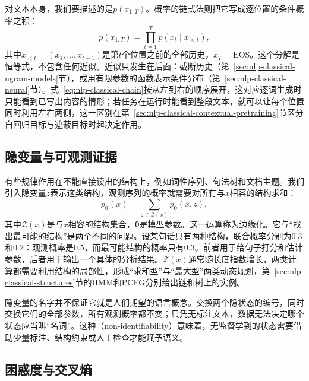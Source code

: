 对文本本身，我们要描述的是$p(x_{1:T})$。概率的链式法则把它写成逐位置的条件概率之积：
\begin{equation}
  p(x_{1:T})=\prod_{t=1}^{T}p(x_t\mid x_{<t}),
  \label{eq:nlp-classical-chain}
\end{equation}
其中$x_{<t}=(x_1,\ldots,x_{t-1})$是第$t$个位置之前的全部历史，$x_T=\mathrm{EOS}$。这个分解是恒等式，不包含任何近似。近似只发生在后面：截断历史（第~\ref{sec:nlp-classical-ngram-models}节），或用有限参数的函数表示条件分布（第~\ref{sec:nlp-classical-neural}节）。式~\eqref{eq:nlp-classical-chain}按从左到右的顺序展开，这对应逐词生成时只能看到已写出内容的情形；若任务在运行时能看到整段文本，就可以让每个位置同时利用左右两侧，这一区别在第~\ref{sec:nlp-classical-contextual-pretraining}节区分自回归目标与遮蔽目标时起决定作用。

\subsection{隐变量与可观测证据}
\label{sec:nlp-classical-latent}

有些规律作用在不能直接读出的结构上，例如词性序列、句法树和文档主题。我们引入隐变量$z$表示这类结构，观测序列的概率就需要对所有与$x$相容的结构求和：
\begin{equation}
  p_{\bm\theta}(x)=\sum_{z\in\mathcal Z(x)}p_{\bm\theta}(x,z),
  \label{eq:nlp-classical-marginal}
\end{equation}
其中$\mathcal Z(x)$是与$x$相容的结构集合，$\bm\theta$是模型参数。这一运算称为边缘化。它与“找出最可能的结构”是两个不同的问题。设某句话只有两种结构，联合概率分别为$0.3$和$0.2$：观测概率是$0.5$，而最可能结构的概率只有$0.3$。前者用于给句子打分和估计参数，后者用于输出一个具体的分析结果。$\mathcal Z(x)$通常随长度指数增长，两类计算都需要利用结构的局部性，形成“求和型”与“最大型”两类动态规划，第~\ref{sec:nlp-classical-structures}节的HMM和PCFG分别给出链和树上的实例。

隐变量的名字并不保证它就是人们期望的语言概念。交换两个隐状态的编号，同时交换它们的全部参数，所有观测概率都不变；只凭无标注文本，数据无法决定哪个状态应当叫“名词”。这种（non-identifiability）意味着，无监督学到的状态需要借助少量标注、结构约束或人工检查才能赋予语义。

\subsection{困惑度与交叉熵}
\label{sec:nlp-classical-perplexity}

